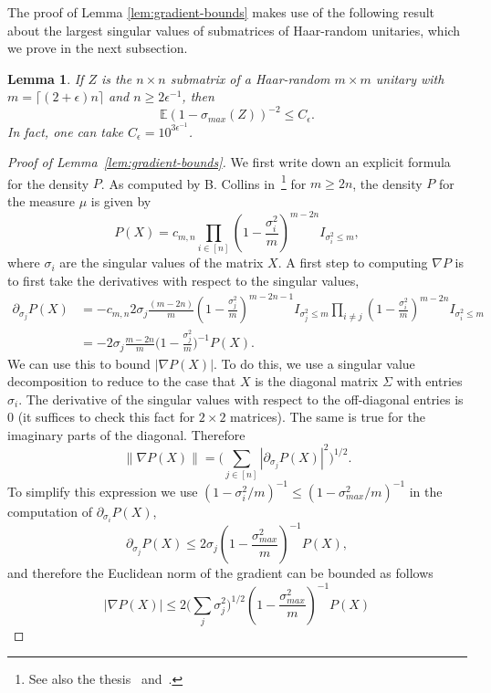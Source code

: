\documentclass[11pt]{article}
\theoremstyle{plain}
\theoremstyle{plain}
\newtheorem{lem}{Lemma}
\theoremstyle{plain}
\theoremstyle{plain}
\theoremstyle{plain}
\theoremstyle{plain}
\theoremstyle{plain}
\theoremstyle{remark}
\theoremstyle{remark}
\theoremstyle{plain}
\theoremstyle{plain}
\theoremstyle{plain}
\theoremstyle{plain}
\newcommand{\eps}{\epsilon}
\newcommand{\Expec}{\mathbb E}
\begin{document}
The proof of Lemma \ref{lem:gradient-bounds} makes use of the following result about the largest singular values of submatrices
of Haar-random unitaries, which we prove in the next subsection.
\begin{lem}
\label{lem:max-sing}
If $Z$ is the $n\times n$ submatrix of a  Haar-random $m\times m$ unitary with $m = \lceil(2+\eps)n\rceil$
and $n\geq 2\eps^{-1}$, then
\[
\Expec (1-\sigma_{max}(Z))^{-2} \leq C_\eps.
\]
In fact, one can take $C_\eps = 10^{3\eps^{-1}}$.
\end{lem}

\begin{proof}[Proof of Lemma~\ref{lem:gradient-bounds}] 
    We first write down an explicit formula for the density $P$.
As computed by B. Collins in~\cite{collins2003integrales}\footnote{See also the thesis~\cite[Eq.~61 on p.~61]{reffy} and~\cite{Aaronson2013}.}
for $m\geq 2n$, the density $P$ for the measure $\mu$ 
is given by
\[
P(X) = c_{m,n}\prod_{i\in [n]} (1-\frac{\sigma_i^2}{m})^{m-2n} I_{\sigma_i^2 \leq m},
\]
where $\sigma_i$ are the singular values of the matrix $X$.
A first step to computing $\nabla P$ is to first take the derivatives with respect to the
singular values,
\begin{align*}
\partial_{\sigma_j} P(X)
&=
-c_{m,n}
2\sigma_j
\frac{(m-2n)}{m}(1-\frac{\sigma_j^2}{m})^{m-2n-1} I_{\sigma_j^2\leq m}
\prod_{i\not=j} (1-\frac{\sigma_i^2}{m})^{m-2n} I_{\sigma_i^2\leq m} \\
&= -2\sigma_j \frac{m-2n}{m} \big(1-\frac{\sigma_j^2}{m}\big)^{-1} P(X).
\end{align*}
We can use this to bound $|\nabla P(X)|$.  To do this, we use a singular value decomposition
to reduce to the case that $X$ is the diagonal matrix $\Sigma$ with entries $\sigma_i$.  The derivative
of the singular values with respect to the off-diagonal entries is $0$ (it suffices to check this fact
for $2\times 2$ matrices).  The same is true for the imaginary parts of the diagonal.  Therefore
\begin{equation}
\label{eq:nablaP-est}
\|\nabla P(X)\|
= \big(\sum_{j\in[n]} |\partial_{\sigma_j} P(X)|^2\big)^{1/2}.
\end{equation}
To simplify this expression we use $(1-\sigma_i^2/m)^{-1} \leq (1-\sigma_{max}^2/m)^{-1}$
in the computation of $\partial_{\sigma_i} P(X)$,
\[
\partial_{\sigma_j} P(X) \leq 2 \sigma_j(1-\frac{\sigma_{max}^2}{m})^{-1} P(X),
\]
and therefore the Euclidean norm of the gradient can be bounded as follows
\[
|\nabla P(X)| \leq 2 \big(\sum_j \sigma_j^2\big)^{1/2} (1-\frac{\sigma_{max}^2}{m})^{-1} P(X)
\]


\end{proof}
\end{document}
